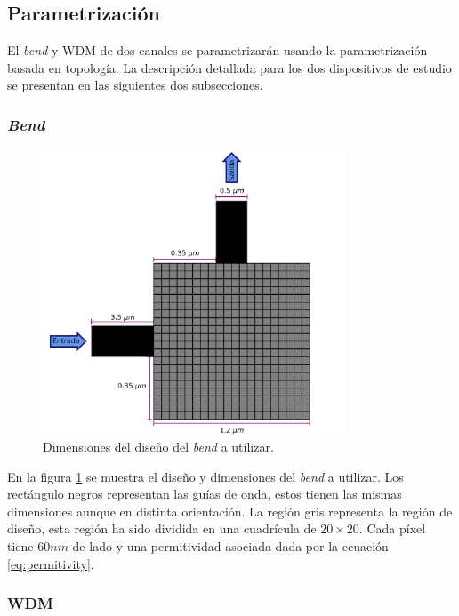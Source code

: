 \subsection{Parametrización}

El \emph{bend} y WDM de dos canales se parametrizarán usando la parametrización basada en topología.
La descripción detallada para los dos dispositivos de estudio se presentan en las siguientes dos subsecciones.

\subsubsection{\emph{Bend}}

\begin{figure}[ht]
  \centering
  \includegraphics[width=0.8\textwidth]{image/proposal/bend.png}
  \caption{Dimensiones del diseño del \emph{bend} a utilizar.}
  \label{fig:dimensiones-bend}
\end{figure}

En la figura \ref{fig:dimensiones-bend} se muestra el diseño y dimensiones del \emph{bend} a utilizar.
Los rectángulo negros representan las guías de onda, estos tienen las mismas dimensiones aunque en distinta orientación.
La región gris representa la región de diseño, esta región ha sido dividida en una cuadrícula de $20 \times 20$.
Cada píxel tiene $60 nm$ de lado y una permitividad asociada dada por la ecuación \ref{eq:permitivity}.

\subsubsection{WDM}

